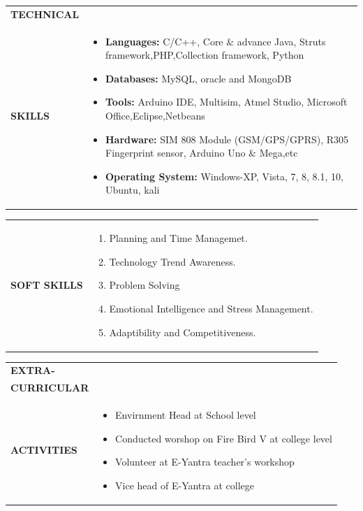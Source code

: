\documentclass{article}
\begin{document}
\begin{table}[h]
    \begin{tabular}{l  p{}} 
      \textbf{\Large{TECHNICAL}} \\  \textbf{\Large{SKILLS}}& 
	\begin{itemize}
	\item \textbf{Languages: } C/C++, Core \& advance Java, Struts framework,PHP,Collection framework, Python
	\item \textbf{Databases: } MySQL, oracle and MongoDB
	\item \textbf{Tools: }Arduino IDE, Multisim, Atmel Studio, Microsoft Office,Eclipse,Netbeans
	\item \textbf{Hardware: }SIM 808 Module (GSM/GPS/GPRS), R305 Fingerprint sensor, Arduino Uno \& Mega,etc
	\item \textbf{Operating System: }Windows-XP, Vista, 7, 8, 8.1, 10, Ubuntu, kali
   	\end{itemize} 
    \end{tabular}
\end{table}

\begin{table}[h!]
    \begin{tabular}{l  p{}} 
      \textbf{\Large{SOFT SKILLS}} & 
	\begin{enumerate}
	\item Planning and Time Managemet.
	\item Technology Trend Awareness.
	\item Problem Solving
	\item Emotional Intelligence and Stress Management.
	\item Adaptibility and Competitiveness.
   	\end{enumerate} 
    \end{tabular}
\end{table}

\begin{table}[h]
    \begin{tabular}{l  p{}} 
      \textbf{\Large{EXTRA-}} \\  \textbf{\Large{CURRICULAR}}\\ \textbf{\Large{ACTIVITIES}}&
	\begin{itemize}
	\item Envirnment Head at School level
	\item Conducted worshop on Fire Bird V at college level
	\item Volunteer at E-Yantra teacher's workshop
	\item Vice head of E-Yantra at college
   	\end{itemize} 
    \end{tabular}
\end{table}
\end{document}
